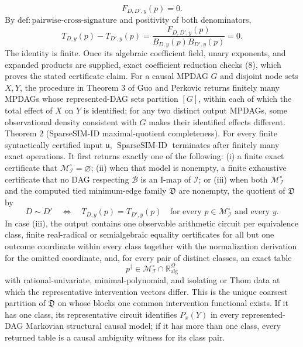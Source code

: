 \[
 F_{D,D',y}(p)=0. \tag{9}
\]
By \(\mathrm{def{:}pairwise\text{-}cross\text{-}signature}\) and positivity of both denominators,
\[
 T_{D,y}(p)-T_{D',y}(p)
 =\frac{F_{D,D',y}(p)}{B_{D,y}(p)B_{D',y}(p)}=0. \tag{10}
\]
The identity is finite.  Once its algebraic coefficient field, unary exponents, and expanded products are supplied, exact coefficient reduction checks (8), which proves the stated certificate claim.
For a causal MPDAG \(G\) and disjoint node sets \(X,Y\), the procedure in Theorem 3 of Guo and Perkovic returns finitely many MPDAGs whose represented-DAG sets partition \([G]\), within each of which the total effect of \(X\) on \(Y\) is identified; for any two distinct output MPDAGs, some observational density consistent with \(G\) makes their identified effects different.
Theorem 2 (SparseSIM-ID maximal-quotient completeness).  For every finite syntactically certified input \(\mathfrak u\), \(\operatorname{SparseSIM\text{-}ID}\) terminates after finitely many exact operations.  It first returns exactly one of the following: (i) a finite exact certificate that \(\mathcal M_{\mathcal I}^{\circ}=\varnothing\); (ii) when that model is nonempty, a finite exhaustive certificate that no DAG respecting \(\mathcal B\) is an I-map of \(\mathcal I\); or (iii) when both \(\mathcal M_{\mathcal I}^{\circ}\) and the computed tied minimum-edge family \(\mathfrak D\) are nonempty, the quotient of \(\mathfrak D\) by
\[
 D\sim D'
 \quad\Longleftrightarrow\quad
 T_{D,y}(p)=T_{D',y}(p)
 \quad\text{for every }p\in\mathcal M_{\mathcal I}^{\circ}
 \text{ and every }y. \tag{11}
\]
In case (iii), the output contains one observable arithmetic circuit per equivalence class, finite real-radical or semialgebraic equality certificates for all but one outcome coordinate within every class together with the normalization derivation for the omitted coordinate, and, for every pair of distinct classes, an exact table
\[
 p^\dagger\in\mathcal M_{\mathcal I}^{\circ}\cap\mathbb R_{\mathrm{alg}}^\Omega
\]
with rational-univariate, minimal-polynomial, and isolating or Thom data at which the representative intervention vectors differ.  This is the unique coarsest partition of \(\mathfrak D\) on whose blocks one common intervention functional exists.  If it has one class, its representative circuit identifies \(P_x(Y)\) in every represented-DAG Markovian structural causal model; if it has more than one class, every returned table is a causal ambiguity witness for its class pair.

